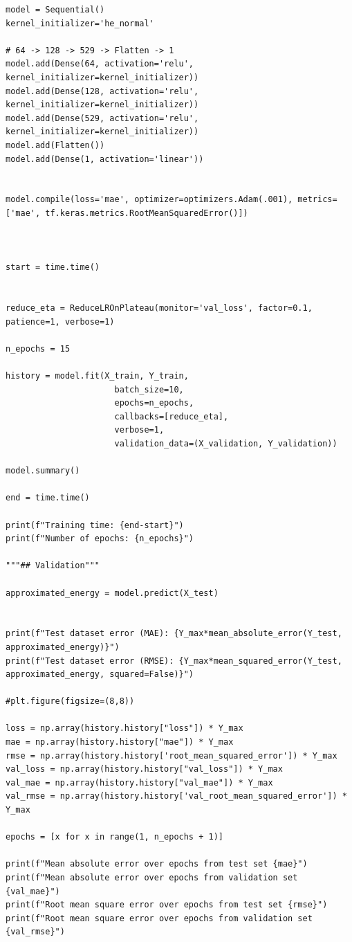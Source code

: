 \documentclass[a4paper,oneside,openright,11pt]{book}
\begin{document}
\begin{lstlisting}
model = Sequential()
kernel_initializer='he_normal'

# 64 -> 128 -> 529 -> Flatten -> 1
model.add(Dense(64, activation='relu', kernel_initializer=kernel_initializer))
model.add(Dense(128, activation='relu', kernel_initializer=kernel_initializer))
model.add(Dense(529, activation='relu', kernel_initializer=kernel_initializer))
model.add(Flatten())
model.add(Dense(1, activation='linear'))


model.compile(loss='mae', optimizer=optimizers.Adam(.001), metrics=['mae', tf.keras.metrics.RootMeanSquaredError()])



start = time.time()


reduce_eta = ReduceLROnPlateau(monitor='val_loss', factor=0.1, patience=1, verbose=1)

n_epochs = 15

history = model.fit(X_train, Y_train,
                      batch_size=10,
                      epochs=n_epochs, 
                      callbacks=[reduce_eta],
                      verbose=1,
                      validation_data=(X_validation, Y_validation))

model.summary()

end = time.time()

print(f"Training time: {end-start}")
print(f"Number of epochs: {n_epochs}")

"""## Validation"""

approximated_energy = model.predict(X_test)


print(f"Test dataset error (MAE): {Y_max*mean_absolute_error(Y_test, approximated_energy)}")
print(f"Test dataset error (RMSE): {Y_max*mean_squared_error(Y_test, approximated_energy, squared=False)}")

#plt.figure(figsize=(8,8))

loss = np.array(history.history["loss"]) * Y_max
mae = np.array(history.history["mae"]) * Y_max
rmse = np.array(history.history['root_mean_squared_error']) * Y_max
val_loss = np.array(history.history["val_loss"]) * Y_max
val_mae = np.array(history.history["val_mae"]) * Y_max
val_rmse = np.array(history.history['val_root_mean_squared_error']) * Y_max

epochs = [x for x in range(1, n_epochs + 1)]

print(f"Mean absolute error over epochs from test set {mae}")
print(f"Mean absolute error over epochs from validation set {val_mae}")
print(f"Root mean square error over epochs from test set {rmse}")
print(f"Root mean square error over epochs from validation set {val_rmse}")


\end{lstlisting}
\end{document}
